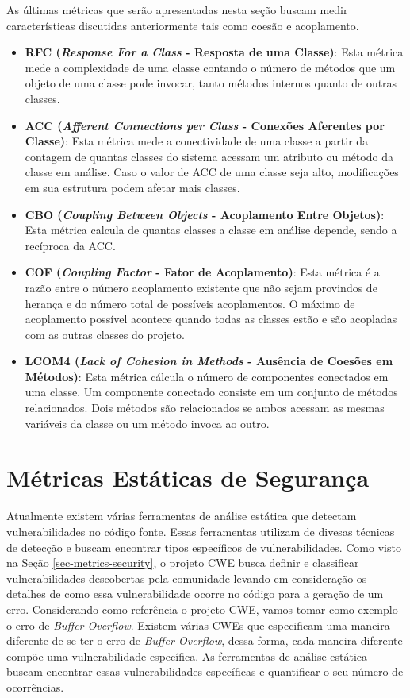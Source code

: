 %

As últimas métricas que serão apresentadas nesta seção buscam medir características discutidas anteriormente tais como coesão e acoplamento.

%

\begin{itemize}
\item \textbf{RFC (\emph{Response For a Class} - Resposta de uma Classe)}: Esta métrica mede a complexidade de uma classe contando o número de métodos que um objeto de uma classe pode invocar, tanto métodos internos quanto de outras classes.
\item \textbf{ACC (\emph{Afferent Connections per Class} - Conexões Aferentes por Classe)}: Esta métrica mede a conectividade de uma classe a partir da contagem de quantas classes do sistema acessam um atributo ou método da classe em análise. Caso o valor de ACC de uma classe seja alto, modificações em sua estrutura podem afetar mais classes.
\item \textbf{CBO (\emph{Coupling Between Objects} - Acoplamento Entre Objetos)}: Esta métrica calcula de quantas classes a classe em análise depende, sendo a recíproca da ACC.
\item \textbf{COF (\emph{Coupling Factor} - Fator de Acoplamento)}: Esta métrica é a razão entre o número acoplamento existente que não sejam provindos de herança e do número total de possíveis acoplamentos. O máximo de acoplamento possível acontece quando todas as classes estão e são acopladas com as outras classes do projeto.
\item \textbf{LCOM4 (\emph{Lack of Cohesion in Methods} - Ausência de Coesões em Métodos)}: Esta métrica cálcula o número de componentes conectados em uma classe. Um componente conectado consiste em um conjunto de métodos relacionados. Dois métodos são relacionados se ambos acessam as mesmas variáveis da classe ou um método invoca ao outro.
\end{itemize}


\section{Métricas Estáticas de Segurança}
\label{subsec-security-metrics}

Atualmente existem várias ferramentas de análise estática que detectam vulnerabilidades no código fonte. Essas ferramentas utilizam de divesas técnicas de detecção e buscam encontrar tipos específicos de vulnerabilidades. Como visto na Seção \ref{sec-metrics-security}, o projeto CWE busca definir  e classificar vulnerabilidades descobertas pela comunidade levando em consideração os detalhes de como essa vulnerabilidade ocorre no código para a geração de um erro. Considerando como referência o projeto CWE, vamos tomar como exemplo o erro de \emph{Buffer Overflow}. Existem várias CWEs que especificam uma maneira diferente de se ter o erro de \emph{Buffer Overflow}, dessa forma, cada maneira diferente compõe uma vulnerabilidade específica. As ferramentas de análise estática buscam  encontrar essas vulnerabilidades específicas e quantificar o seu número de ocorrências. 

